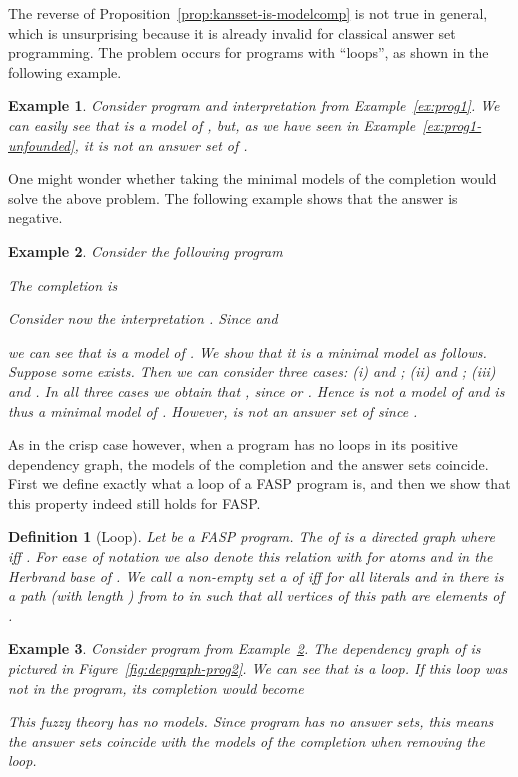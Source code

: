 \documentclass{tlp}
\newtheorem{definition}{Definition}
\newtheorem{example}{Example}
\begin{document}
The reverse of Proposition~\ref{prop:kansset-is-modelcomp} is not true in general, which is unsurprising because it is already invalid for classical answer set programming. The problem occurs for programs with ``loops'', as shown in the following example.

\begin{example}
 Consider program  and interpretation  from Example~\ref{ex:prog1}. We can easily see that  is a model of , but, as we have seen in Example~\ref{ex:prog1-unfounded}, it is not an answer set of .
\end{example}

One might wonder whether taking the minimal models of the completion would solve the above problem. The following example shows that the answer is negative.

\begin{example}\label{ex:progmin}
 Consider the following program 
 
 \noindent The completion  is
 
 \noindent Consider now the interpretation . Since  and 
  
 we can see that  is a model of . We show that it is a minimal model as follows. Suppose some  exists. Then we can consider three cases: (i)  and ; (ii)  and ; (iii)  and . In all three cases we obtain that , since  or . Hence  is not a model of  and  is thus a minimal model of .
 However,  is not an answer set of  since .
\end{example}




As in the crisp case however, when a program has no loops in its positive dependency graph, the models of the completion and the answer sets coincide. First we define exactly what a loop of a FASP program is, and then we show that this property indeed still holds for FASP.

\begin{definition}[Loop]\label{def:loop}
 Let  be a FASP program. The  of  is a directed graph  where  iff . For ease of notation we also denote this relation with  for atoms  and  in the Herbrand base of . We call a non-empty set  a  of  iff for all literals  and  in  there is a path (with length ) from  to  in  such that all vertices of this path are elements of .
\end{definition}

\begin{example}
 Consider program  from Example~\ref{ex:progmin}. The dependency graph of  is pictured in Figure~\ref{fig:depgraph-prog2}. We can see that  is a loop. If this loop was not in the program, its completion would become
 
 This fuzzy theory has no models. Since program  has no answer sets, this means the answer sets coincide with the models of the completion when removing the loop.
\end{example}
\end{document}
